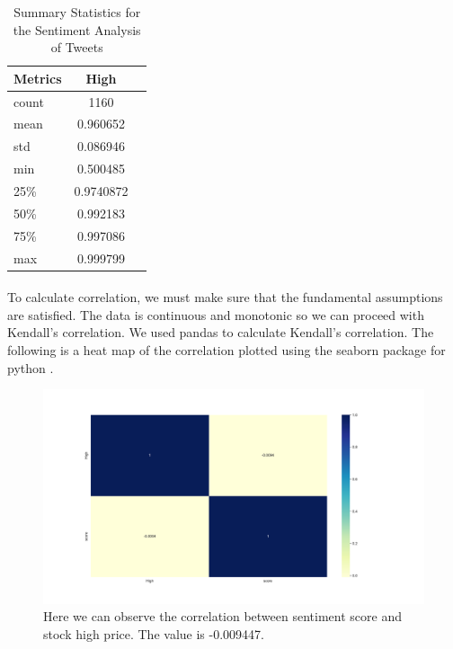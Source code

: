 \documentclass[12pt, letterpaper, titlepage]{article}
\begin{document}
\begin{table}[!hb]
  \begin{center}
    \caption{Summary Statistics for the Sentiment Analysis of Tweets}
    \label{tab:table2}
    \begin{tabular}{l|c|r} %
      \textbf{Metrics} & \textbf{High} \\
      \hline
      count & 1160 \\
      mean & 0.960652 \\
      std & 0.086946 \\
      min & 0.500485 \\
      25\% & 0.9740872 \\
      50\% & 0.992183 \\
      75\% & 0.997086 \\
      max & 0.999799 \\
    \end{tabular}
  \end{center}
\end{table}

\paragraph{}
To calculate correlation, we must make sure that the fundamental assumptions are satisfied. The data is continuous and monotonic so we can proceed with Kendall's correlation. We used pandas to calculate Kendall's correlation. The following is a heat map of the correlation plotted using the seaborn package for python \cite{Waskom2021}.

\begin{figure}[H]
  \begin{center}
  \includegraphics[width=\textwidth]{../figures/fig2.pdf}
  \caption{Here we can observe the correlation between sentiment score and stock high price. The value is -0.009447. }\label{fig:fig2}
  \end{center}
\end{figure}
\end{document}
